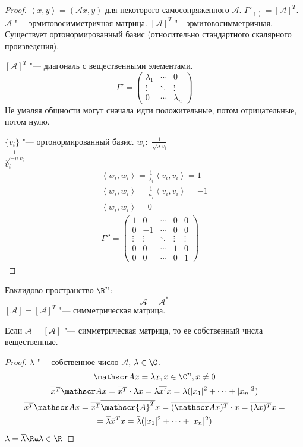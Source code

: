 \begin{proof}
	$\left<x, y\right> = (\mathscr Ax, y)$ для некоторого самосопряженного $\mathscr A$.
	$\Gamma'_{\left<\right>} = [\mathscr A]^T$.
	$\mathscr A$ "--- эрмитовосимметричная матрица.
	$[\mathscr A]^T$ "---эрмитовосимметричная.
	Существует ортонормированный базис (относительно стандартного скалярного произведения).

	$[\mathscr A]^T$ "--- диагональ с вещественными элементами.
	\[
		\Gamma' = \begin{pmatrix}
			\lambda_1 & \cdots & 0 \\
			\vdots & \ddots & \vdots \\
			0 & \cdots & \lambda_n
		\end{pmatrix}
	\]
	Не умаляя общности могут сначала идти положительные, потом отрицательные, потом нулю.

	$\{v_i\}$ "--- ортонормированный базис.
	$w_i:$
	$\frac{1}{\sqrt{\lambda}v_i}$\\
	$\frac{1}{\sqrt{-\mu}v_i}$\\
	$v_i$ \TODO
	\begin{gather*}
		\left<w_i, w_i\right> = \frac1{\lambda_i} \left<v_i, v_i\right> = 1 \\
		\left<w_i, w_i\right> = \frac1{\mu_i} \left<v_i, v_i\right> = -1 \\
		\left<w_i, w_i\right> = 0 \\
		\Gamma'' = \begin{pmatrix}
			1 & 0 &\cdots & 0 & 0 \\
			0 &-1 &\cdots & 0 & 0 \\
			\vdots&\vdots &\ddots&\vdots&\vdots\\
			0 & 0 &\cdots & 1 & 0 \\
			0 & 0 &\cdots & 0 & 1
		\end{pmatrix}
	\end{gather*}
\end{proof}

Евклидово пространство $\R^n$:
\[ \mathscr A = \mathscr{A}^* \]
$[\mathscr A] = [\mathscr A]^T$  "--- симметрическая матрица.

\begin{lemma}
	Если $\mathscr A = [\mathscr A]$ "--- симметрическая матрица, то ее собственный числа вещественные.
\end{lemma}

\begin{proof}
	$\lambda$ "--- собственное число $\mathscr A$, $\lambda \in \C$.
	\begin{gather*}
		\mathscr Ax = \lambda x, x \in \C^n, x \ne 0 \\
		\overline{x^T} \mathscr Ax
		= \overline{x^T} \cdot \lambda x
		= \lambda \overline{x^t}x
		= \lambda(|x_1|^2 + \cdots + |x_n|^2) \\
		\overline{x^T} \mathscr Ax
		= \overline{x^T} \overline{\mathscr{A}^T}x
		= \overline{(\mathscr Ax)^T} \cdot x
		= \overline{(\lambda x)^T} x = \\
		= \overline{\lambda}\bar x^Tx = \bar \lambda(|x_1|^2 + \cdots + |x_n|^2)
	\end{gather*}
	$\lambda = \overline{\lambda} \Ra \lambda \in \R$
\end{proof}

